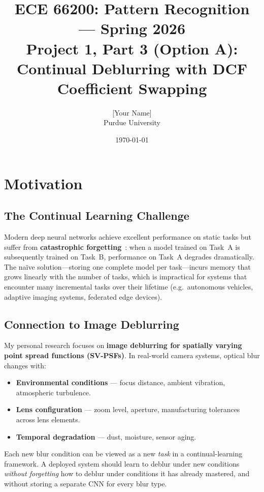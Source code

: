 \documentclass[11pt,letterpaper]{article}
\title{\textbf{ECE 66200: Pattern Recognition --- Spring 2026}\\[4pt]
       \Large Project 1, Part 3 (Option A):\\
       \Large Continual Deblurring with DCF Coefficient Swapping}
\author{[Your Name] \\ Purdue University}
\date{\today}
\begin{document}
\maketitle
\tableofcontents
\newpage

\section{Motivation}
\label{sec:motivation}

\subsection{The Continual Learning Challenge}

Modern deep neural networks achieve excellent performance on static tasks but
suffer from \textbf{catastrophic forgetting}~\cite{french1999catastrophic}:
when a model trained on Task~A is subsequently trained on Task~B, performance
on Task~A degrades dramatically.  The na\"{i}ve solution---storing one
complete model per task---incurs memory that grows linearly with the number of
tasks, which is impractical for systems that encounter many incremental tasks
over their lifetime (e.g.\ autonomous vehicles, adaptive imaging systems,
federated edge devices).

\subsection{Connection to Image Deblurring}

My personal research focuses on \textbf{image deblurring for spatially varying
point spread functions (SV-PSFs)}.  In real-world camera systems, optical blur
changes with:
\begin{itemize}[leftmargin=*]
    \item \textbf{Environmental conditions} --- focus distance, ambient
          vibration, atmospheric turbulence.
    \item \textbf{Lens configuration} --- zoom level, aperture, manufacturing
          tolerances across lens elements.
    \item \textbf{Temporal degradation} --- dust, moisture, sensor aging.
\end{itemize}
Each new blur condition can be viewed as a new \emph{task} in a continual-learning
framework.  A deployed system should learn to deblur under new conditions
\emph{without forgetting} how to deblur under conditions it has already
mastered, and without storing a separate CNN for every blur type.
\end{document}
